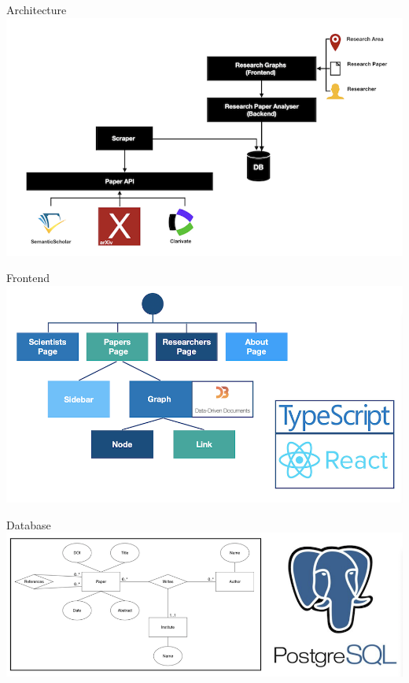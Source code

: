 \documentclass{beamer}
\begin{document}
\begin{frame}{Architecture}
    \includegraphics{img_03.png}
\end{frame}

\begin{frame}{Frontend}
    \includegraphics{img_06.png}
\end{frame}

\begin{frame}{Database}
    \includegraphics{img_07.png}
\end{frame}
\end{document}
